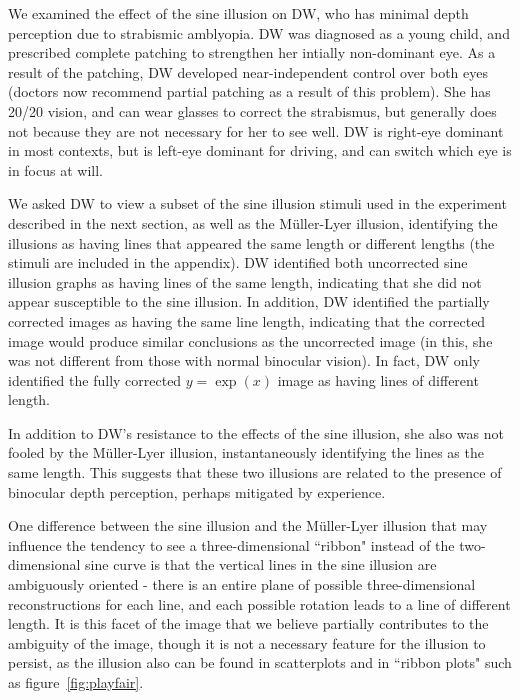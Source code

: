 \documentclass[11pt]{isuthesis}\usepackage[]{graphicx}\usepackage[]{color}
\begin{document}
We examined the effect of the sine illusion on DW, who has minimal depth perception due to strabismic amblyopia. DW was diagnosed as a young child, and prescribed complete patching to strengthen her intially non-dominant eye. As a result of the patching, DW developed near-independent control over both eyes (doctors now recommend partial patching as a result of this problem). She has 20/20 vision, and can wear glasses to correct the strabismus, but generally does not because they are not necessary for her to see well. DW is right-eye dominant in most contexts, but is left-eye dominant for driving, and can switch which eye is in focus at will. 

We asked DW to view a subset of the sine illusion stimuli used in the experiment described in the next section, as well as the M\"uller-Lyer illusion, identifying the illusions as having lines that appeared the same length or different lengths (the stimuli are included in the appendix). DW identified both uncorrected sine illusion graphs as having lines of the same length, indicating that she did not appear susceptible to the sine illusion. In addition, DW identified the partially corrected images as having the same line length, indicating that the corrected image would produce similar conclusions as the uncorrected image (in this, she was not different from those with normal binocular vision). In fact, DW only identified the fully corrected $y=\exp(x)$ image as having lines of different length. 

In addition to DW's resistance to the effects of the sine illusion, she also was not fooled by the M\"uller-Lyer illusion, instantaneously identifying the lines as the same length. This suggests that these two illusions are related to the presence of binocular depth perception, perhaps mitigated by experience. 


One difference between the sine illusion and the M\"uller-Lyer illusion that may influence the tendency to see a three-dimensional ``ribbon" instead of the two-dimensional sine curve is that the vertical lines in the sine illusion are ambiguously oriented - there is an entire plane of possible three-dimensional reconstructions for each line, and each possible rotation leads to a line of different length. 
It is this facet of the image that we believe partially contributes to the ambiguity of the image, though it is not a necessary feature for the illusion to persist, as the illusion also can be found in scatterplots and in ``ribbon plots" such as figure~\ref{fig:playfair}. 
\end{document}

